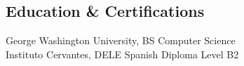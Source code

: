 \documentclass[headline, letterpaper]{res}
\begin{document}
\address{linkedin.com/in/mackenziemorgan, +1 (412) 298-0536\\maco@mackenzie.morgan.name\\GitHub: maco}
\begin{resume}
	



%
%		
%		
		

	\section{Education \& Certifications}
        George Washington University, BS Computer Science\\
		Instituto Cervantes, DELE Spanish Diploma Level B2

\end{resume}
\end{document}
